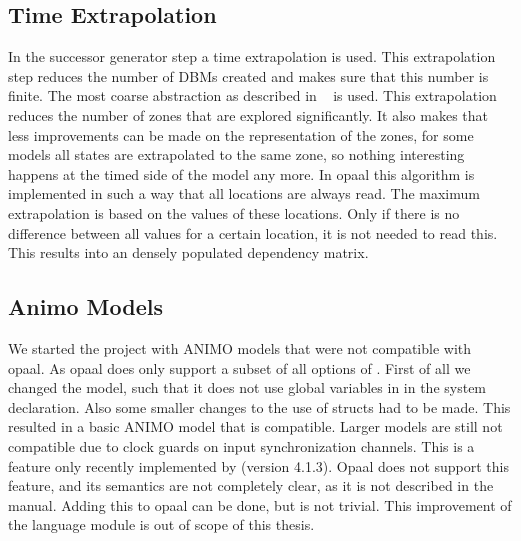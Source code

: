 \subsection{Time Extrapolation}
In the successor generator step a time extrapolation is used. This extrapolation step reduces the number of DBMs created and makes sure that this number is finite. The most coarse abstraction as described in ~\cite{Behrmann2004} is used. This extrapolation reduces the number of zones that are explored significantly. It also makes that less improvements can be made on the representation of the zones, for some models all states are extrapolated to the same zone, so nothing interesting happens at the timed side of the model any more. In opaal this algorithm is implemented in such a way that all \uppaal{} locations are always read. The maximum extrapolation is based on the values of these locations. Only if there is no difference between all values for a certain location, it is not needed to read this. This results into an densely populated dependency matrix. 

\subsection{Animo Models}
We started the project with ANIMO models that were not compatible with opaal. As opaal does only support a subset of all options of \uppaal{}. First of all we changed the model, such that it does not use global variables in in the system declaration. Also some smaller changes to the use of structs had to be made. This resulted in a basic ANIMO model that is compatible. Larger models are still not compatible due to clock guards on input synchronization channels. This is a feature only recently implemented by \uppaal{}(version 4.1.3). Opaal does not support this feature, and its semantics are not completely clear, as it is not described in the manual. Adding this to opaal can be done, but is not trivial. This improvement of the language module is out of scope of this thesis.  
